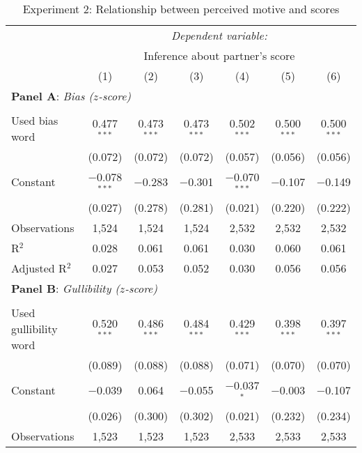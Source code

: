 \begin{table}[!htbp] \centering 
  \caption{Experiment 2: Relationship between perceived motive and scores}
  \label{t:1-validation}
\begin{threeparttable}
\begin{tabular}{@{\hspace{5pt}}l@{\hspace{5pt}}cccccc} 
\toprule 
 & \multicolumn{6}{c}{\textit{Dependent variable:}} \\ 
\cmidrule(rr){2-7} 
 & \multicolumn{6}{c}{Inference about partner's score} \\ 
 & (1) & (2) & (3) & (4) & (5) & (6)\\ 
\midrule  
\midrule
\multicolumn{7}{l}{\textbf{Panel A}: \textit{Bias ($z$-score)}} \\
\midrule
\\[-2.1ex] Used bias word & 0.477$^{***}$ & 0.473$^{***}$ & 0.473$^{***}$ & 0.502$^{***}$ & 0.500$^{***}$ & 0.500$^{***}$ \\ 
  & (0.072) & (0.072) & (0.072) & (0.057) & (0.056) & (0.056) \\ 
 \addlinespace 
 Constant & $-$0.078$^{***}$ & $-$0.283 & $-$0.301 & $-$0.070$^{***}$ & $-$0.107 & $-$0.149 \\ 
  & (0.027) & (0.278) & (0.281) & (0.021) & (0.220) & (0.222) \\ 
 \addlinespace 
\midrule  
Observations & 1,524 & 1,524 & 1,524 & 2,532 & 2,532 & 2,532 \\ 
R$^{2}$ & 0.028 & 0.061 & 0.061 & 0.030 & 0.060 & 0.061 \\ 
Adjusted R$^{2}$ & 0.027 & 0.053 & 0.052 & 0.030 & 0.056 & 0.056 \\ 
\midrule
\midrule
\multicolumn{7}{l}{\textbf{Panel B}: \textit{Gullibility ($z$-score)}} \\
\midrule
\\[-2.1ex] Used gullibility word & 0.520$^{***}$ & 0.486$^{***}$ & 0.484$^{***}$ & 0.429$^{***}$ & 0.398$^{***}$ & 0.397$^{***}$ \\ 
  & (0.089) & (0.088) & (0.088) & (0.071) & (0.070) & (0.070) \\ 
 \addlinespace 
 Constant & $-$0.039 & 0.064 & $-$0.055 & $-$0.037$^{*}$ & $-$0.003 & $-$0.107 \\ 
  & (0.026) & (0.300) & (0.302) & (0.021) & (0.232) & (0.234) \\ 
 \addlinespace 
\midrule  
Observations & 1,523 & 1,523 & 1,523 & 2,533 & 2,533 & 2,533 \\ 

\end{tabular}
\end{threeparttable}
\end{table}
